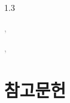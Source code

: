 \documentclass[10pt]{oblivoir}
\begin{document}
\newpage

\begin{center}
  \begin{spacing}{1.3}
    {\LARGE\bfseries \mytitleko}\par
    \vspace{5pt}
    \textcolor{gray}{\myauthorfirstko, \myauthorsecondko}\par
    \textcolor{gray}{\affiliationko}
  \end{spacing}
  \vspace{10pt}
  {\large\bfseries \mytitle}\par
  \vspace{5pt}
  \textcolor{gray}{\myauthorfirst, \myauthorsecond}\par
  \textcolor{gray}{\affiliation}
\end{center}





\section{참고문헌}
\printbibliography[heading=none]

\newpage

\end{document}
